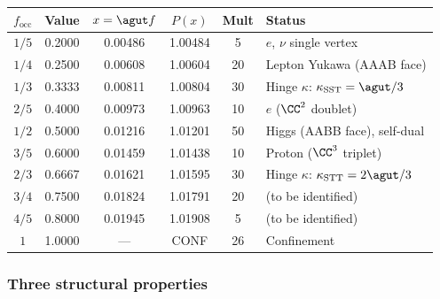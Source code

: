 \begin{center}
\begin{tabular}{cccccl}
\hline
$f_\mathrm{occ}$ & Value & $x = \agut f$ & $P(x)$ & Mult & Status \\
\hline
$1/5$ & 0.2000 & 0.00486 & 1.00484 & 5 & $e$, $\nu$ single vertex \\
$1/4$ & 0.2500 & 0.00608 & 1.00604 & 20 & Lepton Yukawa (AAAB face) \\
$1/3$ & 0.3333 & 0.00811 & 1.00804 & 30 & Hinge $\kappa$: $\kappa_\mathrm{SST} = \agut/3$ \\
$2/5$ & 0.4000 & 0.00973 & 1.00963 & 10 & $e$ ($\CC^2$ doublet) \\
$1/2$ & 0.5000 & 0.01216 & 1.01201 & 50 & Higgs (AABB face), self-dual \\
$3/5$ & 0.6000 & 0.01459 & 1.01438 & 10 & Proton ($\CC^3$ triplet) \\
$2/3$ & 0.6667 & 0.01621 & 1.01595 & 30 & Hinge $\kappa$: $\kappa_\mathrm{STT} = 2\agut/3$ \\
$3/4$ & 0.7500 & 0.01824 & 1.01791 & 20 & (to be identified) \\
$4/5$ & 0.8000 & 0.01945 & 1.01908 & 5 & (to be identified) \\
$1$   & 1.0000 & ---     & CONF    & 26 & Confinement \\
\hline
\end{tabular}
\end{center}

\subsubsection{Three structural properties}

